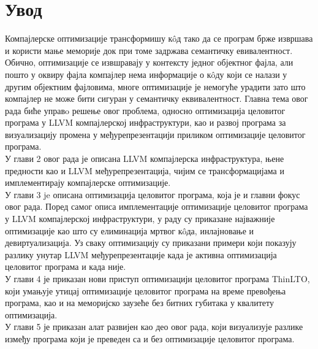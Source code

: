 \documentclass[12pt,oneside]{memoir}
\begin{document}
\frontmatter
\naslovna
\komisija
\tableofcontents*

\mainmatter

\chapter{Увод}

Компајлерске оптимизације трансформишу к\^{o}д тако да се програм брже извршава
и користи мање меморије док при томе задржава семантичку евивалентност.
Обично, оптимизације се извшравају у контексту једног објектног фајла, али
пошто у оквиру фајла компајлер нема информације о к\^{o}ду који се налази у 
другим објектним фајловима, многе оптимизације је немогуће урадити зато што компајлер
не може бити сигуран у семантичку еквивалентност.
Главна тема овог рада биће управo решење овог проблема, односно оптимизација
целовитог програма у LLVM компајлерској инфраструктури, као и развој програма
за визуализацију промена у међурепрезентацији приликом оптимизације
целовитог програма.
\\
У глави 2 овог рада је описана LLVM компајлерска инфраструктура, њене предности
као и LLVM међурепрезентација, чијим се трансформацијама и имплементирају
компајлерске оптимизације.
\\
У глави 3 je описана оптимизација целовитог програма, која је и главни
фокус овог рада.
Поред самог описа имплементације оптимизације целовитог програма у 
LLVM компајлерској инфраструктури, у раду су приказане најважније оптимизације
као што су елиминација мртвог к\^{o}да, инлајновање и девиртуализација.
Уз сваку оптимизацију су приказани примери који показују разлику унутар 
LLVM међурепрезентације када је активна оптимизација целовитог програма
и када није.
\\
У глави 4 је приказан нови приступ оптимизацији целовитог програма ThinLTO,
који умањује утицај оптимизације целовитог програма на време превођења програма,
као и на меморијско заузеће без битних губитака у квалитету оптимизација.
\\
У глави 5 је приказан алат развијен као део овог рада, који визуализује разлике 
између програма који је преведен са и без оптимизације целовитог програма.
\end{document}

